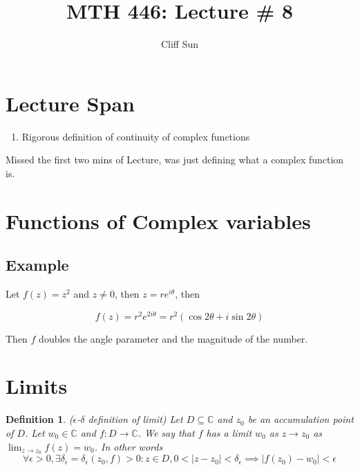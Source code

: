 \documentclass{article}
\title{MTH 446: Lecture \# 8}
\author{Cliff Sun}
\newtheorem{definition}[theorem]{Definition}
\newtheorem{one minute paper}[theorem]{One Minute Paper}
\begin{document}
\maketitle

\section*{Lecture Span}
\begin{enumerate}
    \item Rigorous definition of continuity of complex functions
\end{enumerate}

Missed the first two mins of Lecture, was just defining what a complex function is. 

\section*{Functions of Complex variables}

\subsection*{Example}

Let $f(z) = z^2$ and $z \neq 0$, then $z = re^{i\theta}$, then 

\begin{equation}
    f(z) = r^2e^{2i\theta} = r^2(\cos2\theta + i\sin2\theta)
\end{equation}

Then $f$ doubles the angle parameter and the magnitude of the number. 

\section*{Limits}

\begin{definition}
    ($\epsilon$-$\delta$ definition of limit) Let $D \subseteq \mathbb{C}$ and $z_0$ be an accumulation point of $D$. Let $w_0 \in \mathbb{C}$ and $f: D \rightarrow \mathbb{C}$. We say that $f$ has a limit $w_0$
    as $z \rightarrow z_0$ as $\lim_{z \rightarrow z_0}f(z) = w_0$. In other words 
    \begin{equation}
        \forall \epsilon >0, \exists \delta_{\epsilon} = \delta_{\epsilon}(z_0, f) > 0: z \in D, 0 < |z - z_0| < \delta_{\epsilon} \implies |f(z_0) - w_0| < \epsilon
    \end{equation}
\end{definition}
\end{document}
